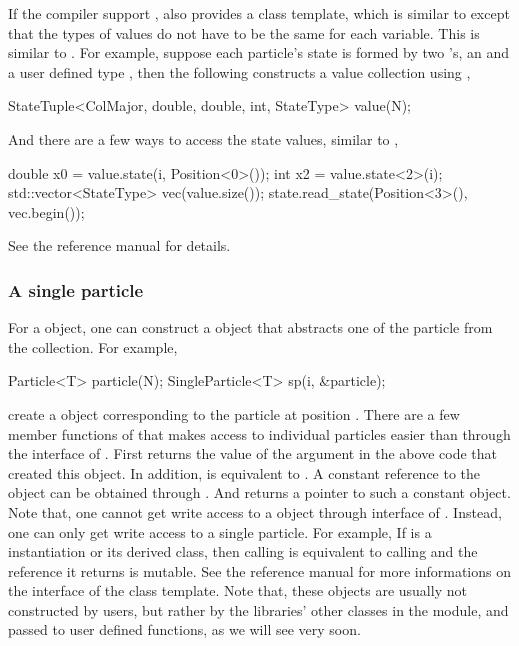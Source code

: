 If the compiler support \cppoo{} , \vsmc also provides a
 class template, which is similar to
 except that the types of values do not have to be the
same for each variable. This is similar to \rlang {}.  For
example, suppose each particle's state is formed by two 's,
an  and a user defined type , then the
following constructs a value collection using ,
\begin{cppcode}
StateTuple<ColMajor, double, double, int, StateType> value(N);
\end{cppcode}
And there are a few ways to access the state values, similar to
,
\begin{cppcode}
double x0 = value.state(i, Position<0>());
int x2 = value.state<2>(i);
std::vector<StateType> vec(value.size());
state.read_state(Position<3>(), vec.begin());
\end{cppcode}
See the reference manual for details.

\subsubsection{A single particle}
\label{ssub:A single particle}

For a  object, one can construct a
 object that abstracts one of the particle from
the collection. For example,
\begin{cppcode}
Particle<T> particle(N);
SingleParticle<T> sp(i, &particle);
\end{cppcode}
create a  object corresponding to the particle at
position . There are a few member functions of
 that makes access to individual particles easier
than through the interface of . First
 returns the value of the argument  in the
above code that created this  object. In
addition,  is equivalent to .
A constant reference to the  object can be obtained
through . And  returns
a pointer to such a constant  object. Note that, one
cannot get write access to a  object through interface
of . Instead, one can only get write access to a
single particle. For example, If  is a 
instantiation or its derived class, then calling  is
equivalent to calling  and the
reference it returns is mutable. See the reference manual for more
informations on the interface of the  class
template. Note that, these  objects are usually
not constructed by users, but rather by the libraries' other classes in the
\smp module, and passed to user defined functions, as we will see very soon.

